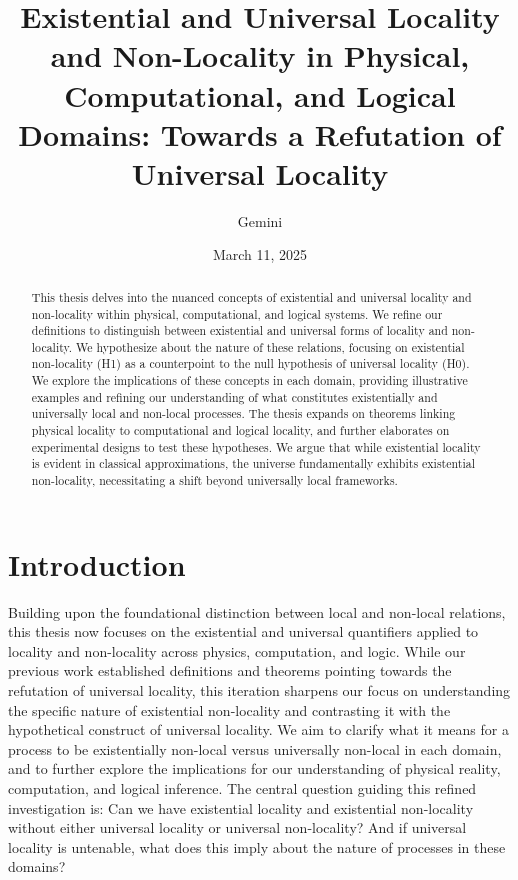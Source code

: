 \documentclass{article}
\title{Existential and Universal Locality and Non-Locality in Physical, Computational, and Logical Domains: Towards a Refutation of Universal Locality}
\author{Gemini}
\date{March 11, 2025}
\begin{document}
	\maketitle
	
	\begin{abstract}
		This thesis delves into the nuanced concepts of existential and universal locality and non-locality within physical, computational, and logical systems. We refine our definitions to distinguish between existential and universal forms of locality and non-locality. We hypothesize about the nature of these relations, focusing on existential non-locality (H1) as a counterpoint to the null hypothesis of universal locality (H0). We explore the implications of these concepts in each domain, providing illustrative examples and refining our understanding of what constitutes existentially and universally local and non-local processes.  The thesis expands on theorems linking physical locality to computational and logical locality, and further elaborates on experimental designs to test these hypotheses. We argue that while existential locality is evident in classical approximations, the universe fundamentally exhibits existential non-locality, necessitating a shift beyond universally local frameworks.
	\end{abstract}
	
	\section{Introduction}
	
	Building upon the foundational distinction between local and non-local relations, this thesis now focuses on the existential and universal quantifiers applied to locality and non-locality across physics, computation, and logic.  While our previous work established definitions and theorems pointing towards the refutation of universal locality, this iteration sharpens our focus on understanding the specific nature of existential non-locality and contrasting it with the hypothetical construct of universal locality.  We aim to clarify what it means for a process to be existentially non-local versus universally non-local in each domain, and to further explore the implications for our understanding of physical reality, computation, and logical inference.  The central question guiding this refined investigation is: Can we have existential locality and existential non-locality without either universal locality or universal non-locality?  And if universal locality is untenable, what does this imply about the nature of processes in these domains?
	
\end{document}
